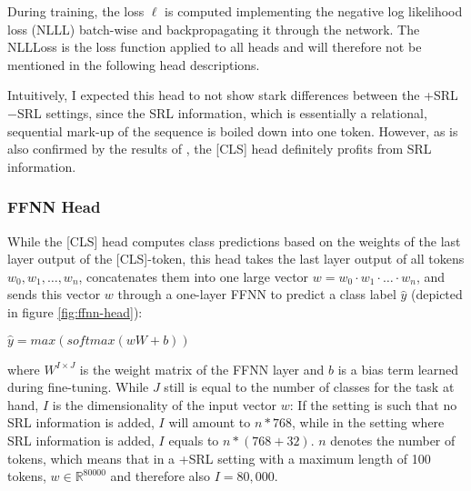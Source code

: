 During training, the loss $\ell $ is computed implementing the negative log likelihood loss
(NLLL) batch-wise and
backpropagating it through the network. The NLLLoss is the loss function applied to all
heads and will therefore not be mentioned in the following head descriptions.

Intuitively, I expected this head to not show stark differences between the +SRL $-$SRL settings,
since the SRL information, which is essentially a relational, sequential mark-up of the sequence is
boiled down into one token. However, as is also confirmed by the results of \cite{zhang2019semantics},
the [CLS] head definitely profits from SRL information.


\subsubsection{FFNN Head}


While the [CLS] head computes class predictions based on the weights of the last layer
output of the [CLS]-token, this head takes the last layer output of all tokens $w_0,
w_1, \dotso , w_n$, concatenates them into one large vector $w = w_0\cdot w_1\cdot \dotso
\cdot w_n$, and sends this vector $w$ through a one-layer FFNN to predict a class label
$\hat{y}$ (depicted in figure \ref{fig:ffnn-head}):

$\hat{y} = max(softmax(wW+b))$

where $W^{I\times J}$ is the weight matrix of the FFNN layer and $b$ is a bias term learned during
fine-tuning. While $J$ still is equal to the number of classes for the task at hand, $I$ is the
dimensionality of the input vector $w$: If the setting is such that no SRL information is added,
$I$ will amount to $n * 768$, while in the setting where SRL information is added, $I$ equals to $n
* (768+32)$. $n$ denotes the number of tokens, which means that in a +SRL setting with a maximum
length of 100 tokens, $w \in \mathbb{R}^{80000}$ and therefore also $I = 80,000$.

